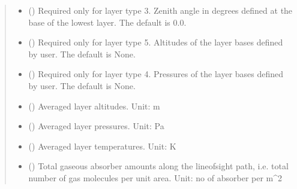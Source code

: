\documentclass[letterpaper,10pt,english]{sphinxmanual}
\begin{document}
\begin{fulllineitems}
\begin{quote}
\begin{description}
\begin{itemize}
\item {} 
\sphinxAtStartPar
{} (\sphinxstyleliteralemphasis{\sphinxupquote{, }}) \textendash{} Required only for layer type 3.
Zenith angle in degrees defined at the base of the lowest layer.
The default is 0.0.

\item {} 
\sphinxAtStartPar
{}\sphinxstyleliteralstrong{\sphinxupquote{(}}\sphinxstyleliteralstrong{\sphinxupquote{)}} (\sphinxstyleliteralemphasis{\sphinxupquote{, }}) \textendash{} Required only for layer type 5.
Altitudes of the layer bases defined by user.
The default is None.

\item {} 
\sphinxAtStartPar
{}\sphinxstyleliteralstrong{\sphinxupquote{(}}\sphinxstyleliteralstrong{\sphinxupquote{)}} (\sphinxstyleliteralemphasis{\sphinxupquote{, }}) \textendash{} Required only for layer type 4.
Pressures of the layer bases defined by user.
The default is None.

\end{itemize}

\sphinxAtStartPar
\begin{itemize}
\item {} 
\sphinxAtStartPar
{} () \textendash{} Averaged layer altitudes.
Unit: m

\item {} 
\sphinxAtStartPar
{} () \textendash{} Averaged layer pressures.
Unit: Pa

\item {} 
\sphinxAtStartPar
{} () \textendash{} Averaged layer temperatures.
Unit: K

\item {} 
\sphinxAtStartPar
{} () \textendash{} Total gaseous absorber amounts along the line\sphinxhyphen{}of\sphinxhyphen{}sight path, i.e.
total number of gas molecules per unit area.
Unit: no of absorber per m\textasciicircum{}2


\end{itemize}
\end{description}
\end{quote}
\end{fulllineitems}
\end{document}
